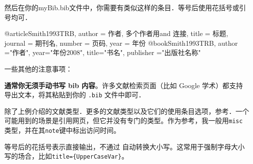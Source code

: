 然后在你的myBib.bib文件中，你需要有类似这样的条目．等号后使用花括号或引号均可．
\begin{latex}
@article{Smith1993TRB,
    author = {作者, 多个作者用and 连接},
    title = {标题},
    journal = {期刊名},
    number = {页码},
    year = {年份}}
@book{Smith1993TRB,
    author ="作者",
    year="年份2008",
    title="书名",
    publisher ="出版社名称"}
\end{latex}

一些其他的注意事项：
\begin{feai}
  \item \textbf{通常你无须手动书写 bib 内容}。许多文献检索页面（比如 Google 学术）都支持导出\bibtex 文本，将其粘贴到你的 \texttt{.bib} 文件中即可．
  \item 除了上例介绍的文献类型．更多的文献类型以及它们的使用条目选项，参考．一个可能用到的场景是引用网页，但它并没有专门的类型。作为参考，我一般用\texttt{misc}类型，并在其\texttt{note}键中标出访问时间。
  \item 等号后的花括号表示直接输出，不通过 \bibtex 自动转换大小写。这常用于强制字母大小写的场合，比如\texttt{title=\{UpperCaseVar\}}。
\end{feai}

